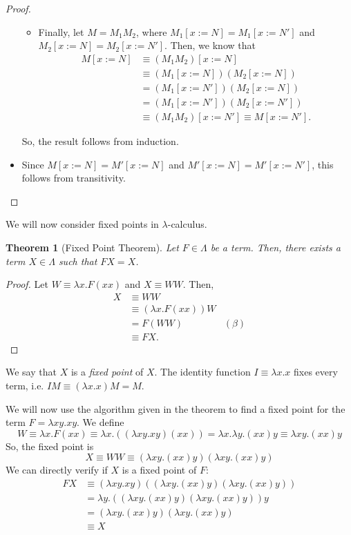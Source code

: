 \documentclass[a4paper, openany]{memoir}
\newtheorem{theorem}[proposition]{Theorem}
\theoremstyle{definition}
\begin{document}
\begin{proof}
\begin{itemize}
\begin{itemize}
                \item Finally, let $M = M_1 M_2$, where $M_1[x := N] = M_1[x := N']$ and $M_2[x := N] = M_2[x := N']$. Then, we know that
                \begin{align*}
                    M[x := N] &\equiv (M_1 M_2)[x := N] \\
                    &\equiv (M_1[x := N]) (M_2[x := N]) \\
                    &= (M_1[x := N']) (M_2[x := N]) \\
                    &= (M_1[x := N']) (M_2[x := N']) \\
                    &\equiv (M_1 M_2)[x := N'] \equiv M[x := N'].
                \end{align*}
            \end{itemize}
            So, the result follows from induction.
            
            \item Since $M[x := N] = M'[x := N]$ and $M'[x := N] = M'[x := N']$, this follows from transitivity.
        \end{itemize}
    \end{proof}

    We will now consider fixed points in $\lambda$-calculus.
    \begin{theorem}[Fixed Point Theorem]
        Let $F \in \Lambda$ be a term. Then, there exists a term $X \in \Lambda$ such that $FX = X$.
    \end{theorem}
    \begin{proof}
        Let $W \equiv \lambda x.F(xx)$ and $X \equiv WW$. Then,
        \begin{align*}
            X &\equiv WW \\
            &\equiv (\lambda x.F(xx)) W \\
            &= F(WW) & (\beta) \\
            &\equiv FX.
        \end{align*}
    \end{proof}
    \noindent We say that $X$ is a \emph{fixed point} of $X$. The identity function $I \equiv \lambda x.x$ fixes every term, i.e. $IM \equiv (\lambda x.x)M = M$. 
    
    We will now use the algorithm given in the theorem to find a fixed point for the term $F = \lambda xy.xy$. We define
    \[W \equiv \lambda x.F(xx) \equiv \lambda x.((\lambda xy.xy)(xx)) = \lambda x.\lambda y.(xx)y \equiv \lambda xy.(xx)y\]
    So, the fixed point is
    \[X \equiv WW \equiv (\lambda xy.(xx)y)(\lambda xy.(xx)y)\]
    We can directly verify if $X$ is a fixed point of $F$:
    \begin{align*}
        FX &\equiv (\lambda xy.xy)((\lambda xy.(xx)y)(\lambda xy.(xx)y)) \\
        &= \lambda y.((\lambda xy.(xx)y)(\lambda xy.(xx)y))y \\
        &= (\lambda xy.(xx)y)(\lambda xy.(xx)y) \\
        &\equiv X
    \end{align*}
    
\end{document}
